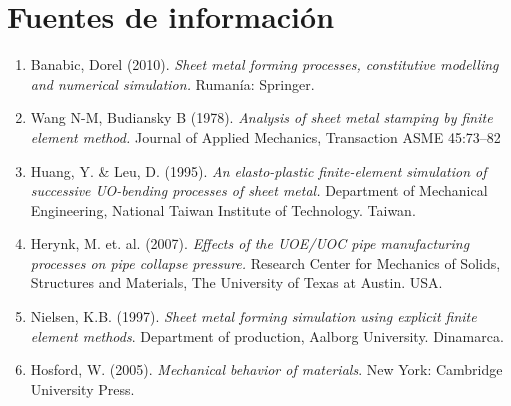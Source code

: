 \chapter*{Fuentes de información}

\begin{enumerate}
\item Banabic, Dorel (2010). \textit{Sheet metal forming processes, constitutive modelling and numerical simulation.} Rumanía: Springer.

\item Wang N-M, Budiansky B (1978). \textit{Analysis of sheet metal stamping by finite element method.} Journal of Applied Mechanics, Transaction ASME 45:73–82

\item Huang, Y. & Leu, D. (1995). \textit{An elasto-plastic finite-element simulation of successive UO-bending processes of sheet metal.} Department of Mechanical Engineering, National Taiwan Institute of Technology. Taiwan.

\item Herynk, M. et. al. (2007). \textit{Effects of the UOE/UOC pipe manufacturing processes on pipe collapse pressure.} Research Center for Mechanics of Solids, Structures and Materials, The University of Texas at Austin. USA.

\item Nielsen, K.B. (1997). \textit{Sheet metal forming simulation using explicit finite element methods}. Department of production, Aalborg University. Dinamarca.

\item Hosford, W. (2005). \textit{Mechanical behavior of materials}. New York: Cambridge University Press.



\end{enumerate}
